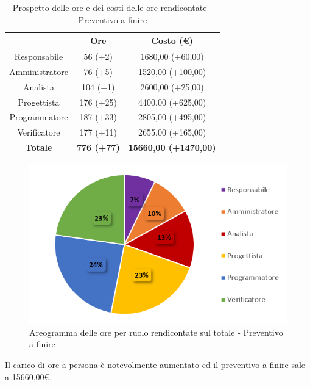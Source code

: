 \begin{table}[H]
  \centering
  \renewcommand{\arraystretch}{1.8}
  \begin{tabular}{c|c|c}
    \rowcolor[HTML]{125E28}
    \multicolumn{1}{c}{\color[HTML]{FFFFFF}\textbf{Ruolo}}
                    & \multicolumn{1}{c}{\color[HTML]{FFFFFF}\textbf{Ore}}
                    & \multicolumn{1}{c}{\color[HTML]{FFFFFF}\textbf{Costo (€)}}                                \\
    \hline
    Responsabile    & 56 (+2)                                                    & 1680,00  (+60,00)            \\
    Amministratore  & 76 (+5)                                                    & 1520,00 (+100,00)            \\
    Analista        & 104 (+1)                                                   & 2600,00 (+25,00)             \\
    Progettista     & 176 (+25)                                                  & 4400,00 (+625,00)            \\
    Programmatore   & 187 (+33)                                                  & 2805,00 (+495,00)            \\
    Verificatore    & 177 (+11)                                                  & 2655,00 (+165,00)            \\
    \textbf{Totale} & \textbf{776 (+77)}                                         & \textbf{15660,00 (+1470,00)} \\
  \end{tabular}
  \caption{Prospetto delle ore e dei costi delle ore rendicontate - Preventivo a finire}
\end{table}

\begin{figure}[H]
  \centering
  \includegraphics[scale=0.9]{immagini/ore_ruolo_preventivo_finire_PB.png}
  \caption{Areogramma delle ore per ruolo rendicontate sul totale - Preventivo a finire}
\end{figure}

Il carico di ore a persona è notevolmente aumentato ed il preventivo a finire sale a 15660,00€.


